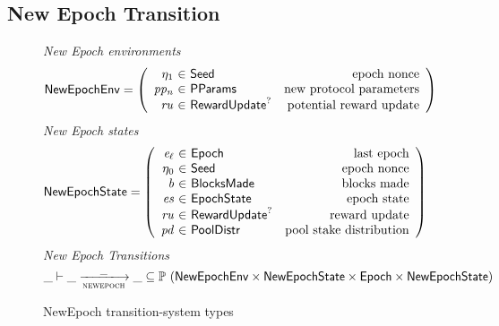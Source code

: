 \clearpage

\subsection{New Epoch Transition}
\label{sec:new-epoch-trans}

\begin{figure}
  \emph{New Epoch environments}
  \begin{equation*}
    \NewEpochEnv =
    \left(
      \begin{array}{r@{~\in~}lr}
        \eta_1 & \Seed & \text{epoch nonce} \\
        \var{pp_n} & \PParams & \text{new protocol parameters} \\
        \var{ru} & \RewardUpdate^? & \text{potential reward update} \\
      \end{array}
    \right)
  \end{equation*}
  \emph{New Epoch states}
  \begin{equation*}
    \NewEpochState =
    \left(
      \begin{array}{r@{~\in~}lr}
        \var{e_\ell} & \Epoch & \text{last epoch} \\
        \eta_0 & \Seed & \text{epoch nonce} \\
        \var{b} & \BlocksMade & \text{blocks made} \\
        \var{es} & \EpochState & \text{epoch state} \\
        \var{ru} & \RewardUpdate^? & \text{reward update} \\
        \var{pd} & \PoolDistr & \text{pool stake distribution} \\
      \end{array}
    \right)
  \end{equation*}
  \emph{New Epoch Transitions}
  \begin{equation*}
    \_ \vdash \var{\_} \trans{newepoch}{\_} \var{\_} \subseteq
    \powerset (\NewEpochEnv \times \NewEpochState \times \Epoch \times \NewEpochState)
  \end{equation*}
  \caption{NewEpoch transition-system types}
  \label{fig:ts-types:newepoch}
\end{figure}

